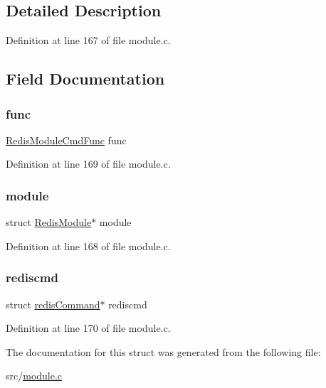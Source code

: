 \subsection{Detailed Description}


Definition at line 167 of file module.\+c.



\subsection{Field Documentation}
\mbox{\label{struct_redis_module_command_proxy_a2e9ebffa1c494b2b6e53f3271290461c}} 
\subsubsection{\texorpdfstring{func}{func}}
{\footnotesize\ttfamily \hyperlink{redismodule_8h_afd84062b24c2151cf8f2a53b955f9eed}{Redis\+Module\+Cmd\+Func} func}



Definition at line 169 of file module.\+c.

\mbox{\label{struct_redis_module_command_proxy_a0b5d3833feb2320585734795fb7f62b6}} 
\subsubsection{\texorpdfstring{module}{module}}
{\footnotesize\ttfamily struct \hyperlink{struct_redis_module}{Redis\+Module}$\ast$ module}



Definition at line 168 of file module.\+c.

\mbox{\label{struct_redis_module_command_proxy_a016430f13b3b7c484584bae32fe89fd5}} 
\subsubsection{\texorpdfstring{rediscmd}{rediscmd}}
{\footnotesize\ttfamily struct \hyperlink{structredis_command}{redis\+Command}$\ast$ rediscmd}



Definition at line 170 of file module.\+c.



The documentation for this struct was generated from the following file\+:\begin{DoxyCompactItemize}
\item 
src/\hyperlink{module_8c}{module.\+c}\end{DoxyCompactItemize}
